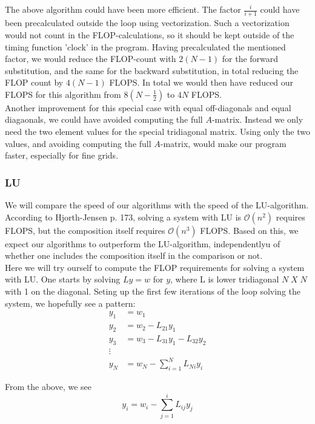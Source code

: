 \documentclass{article}
\begin{document}
The above algorithm could have been more efficient. The factor $\frac{i}{i+1}$ could have been precalculated outside the loop using vectorization. Such a vectorization would not count in the FLOP-calculations, so it should be kept outside of the timing function 'clock' in the program. Having precalculated the mentioned factor, we would reduce the FLOP-count with $2(N-1)$ for the forward substitution, and the same for the backward substitution, in total reducing the FLOP count by $4(N-1)$ FLOPS. In total we would then have reduced our FLOPS for this algorithm from $8(N-\frac{1}{2})$ to $4N$ FLOPS.\\

Another improvement for this special case with equal off-diagonals and equal diagaonals, we could have avoided computing the full $A$-matrix. Instead we only need the two element values for the special tridiagonal matrix. Using only the two values, and avoiding computing the full $A$-matrix, would make our program faster, especially for fine grids.

\subsubsection{LU}
We will compare the speed of our algorithms with the speed of the LU-algorithm. According to Hjorth-Jensen \cite{MHJ} p. 173, solving a system with LU is $\mathcal{O}(n^2)$ requires FLOPS, but the composition itself requires  $\mathcal{O}(n^3)$ FLOPS. Based on this, we expect our algorithms to outperform the LU-algorithm, independentlyu of whether one includes the composition itself in the comparison or not.\\

Here we will try ourself to compute the FLOP requirements for solving a system with LU. One starts by solving $Ly = w$ for $y$, where L is lower tridiagonal $N\; X\; N$ with 1 on the diagonal. Seting up the first few iterations of the loop solving the system, we hopefully see a pattern:
\begin{align}
y_1 &= w_1\\
y_2 &= w_2 - L_{21} y_1\\
y_3 &= w_3 - L_{31} y_1 - L_{32}y_2\\
\vdots\\
y_{N}& = w_N - \sum_{i=1}^{N} L_{Ni} y_i
\end{align}

From the above, we see
\begin{equation}
y_i= w_i -\sum_{j=1}^{i}L_{ij}y_j
\end{equation}
\end{document}
